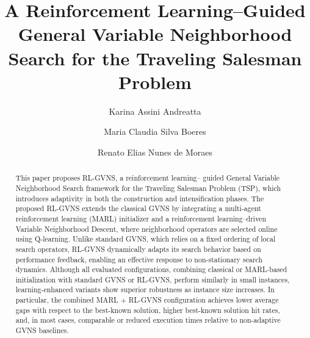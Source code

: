 \documentclass[runningheads]{llncs}
\begin{document}
%
\title{A Reinforcement Learning–Guided General Variable Neighborhood Search for the Traveling Salesman Problem}
%
\author{Karina Assini Andreatta \and
Maria Claudia Silva Boeres \and
Renato Elias Nunes de Moraes}
%
%
%
\maketitle              %
%



\begin{abstract}
This paper proposes RL-GVNS, a reinforcement learning– guided General Variable Neighborhood Search framework for the Traveling Salesman Problem (TSP), which introduces adaptivity in both the construction and intensification phases. The proposed RL-GVNS extends the classical GVNS by integrating a multi-agent reinforcement learning (MARL) initializer and a reinforcement learning–driven Variable Neighborhood Descent, where neighborhood operators are selected online using Q-learning. Unlike standard GVNS, which relies on a fixed ordering of local search operators, RL-GVNS dynamically adapts its search behavior based on performance feedback, enabling an effective response to non-stationary search dynamics.
Although all evaluated configurations, combining classical or MARL-based initialization with standard GVNS or RL-GVNS, perform similarly in small instances, learning-enhanced variants show superior robustness as instance size increases. In particular, the combined MARL + RL-GVNS configuration achieves lower average gaps with respect to the best-known solution, higher best-known solution hit rates, and, in most cases, comparable or reduced execution times relative to non-adaptive GVNS baselines.

\end{abstract}
%
%
%
\end{document}
